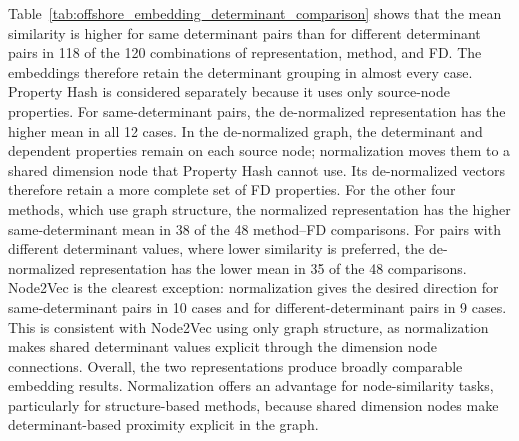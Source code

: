\documentclass[sigconf]{acmart}
\begin{document}
Table~\ref{tab:offshore_embedding_determinant_comparison} shows that the mean similarity is higher for same determinant pairs than for different determinant pairs in 118 of the 120 combinations of representation, method, and FD. The embeddings therefore retain the determinant grouping in almost every case. Property Hash is considered separately because it uses only source-node properties. For same-determinant pairs, the de-normalized representation has the higher mean in all 12 cases. In the de-normalized graph, the determinant and dependent properties remain on each source node; normalization moves them to a shared dimension node that Property Hash cannot use. Its de-normalized vectors therefore retain a more complete set of FD properties. For the other four methods, which use graph structure, the normalized representation has the higher same-determinant mean in 38 of the 48 method--FD comparisons. For pairs with different determinant values, where lower similarity is preferred, the de-normalized representation has the lower mean in 35 of the 48 comparisons. Node2Vec is the clearest exception: normalization gives the desired direction for same-determinant pairs in 10 cases and for different-determinant pairs in 9 cases. This is consistent with Node2Vec using only graph structure, as normalization makes shared determinant values explicit through the dimension node connections. Overall, the two representations produce broadly comparable embedding results. Normalization offers an advantage for node-similarity tasks, particularly for structure-based methods, because shared dimension nodes make determinant-based proximity explicit in the graph.












\end{document}
